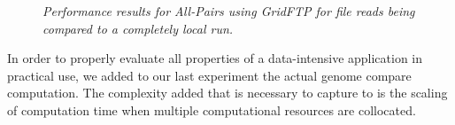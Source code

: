 \documentclass{rspublic}
\begin{document}
\begin{center}
\begin{figure}[ht]
\caption{\textit{Performance results for All-Pairs using GridFTP for
file reads being compared to a completely local run.}}
\label{Fig:ExpIConventionalLocal}
\end{figure}
\end{center}

In order to properly evaluate all properties of a data-intensive
application in practical use, we added to our last experiment the actual genome
compare computation. The complexity added that is necessary to capture to is
the scaling of computation time when multiple computational resources are
collocated.
\end{document}
